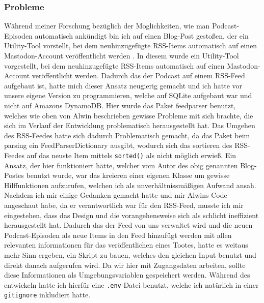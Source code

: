 \documentclass{article}
\begin{document}
\subsubsection{Probleme}
\begin{sloppypar}
  Während meiner Forschung bezüglich der Moglichkeiten, wie man Podcast-Episoden automatisch ankündigt bin ich auf einen Blog-Post gestoßen, der ein Utility-Tool vorstellt, bei dem neuhinzugefügte RSS-Items automatisch auf einen Mastodon-Account veröffentlicht werden \cite{tootrss}. In diesem wurde ein Utility-Tool vorgestellt, bei dem neuhinzugefügte RSS-Items automatisch auf einen Mastodon-Account veröffentlicht werden. Dadurch das der Podcast auf einem RSS-Feed aufgebaut ist, hatte mich dieser Ansatz neugierig gemacht und ich hatte vor unsere eigene Version zu programmieren, welche auf SQLite aufgebaut war und nicht auf Amazons DynamoDB. Hier wurde das Paket feedparser benutzt, welches wie oben von Alwin beschrieben gewisse Probleme mit sich brachte, die sich im Verlauf der Entwicklung problematisch herausgestellt hat. Das Umgehen des RSS-Feedes hatte sich dadurch Problematisch gemacht, da das Paket beim parsing ein FeedParserDictionary ausgibt, wodurch sich das sortieren des RSS-Feedes auf das neuste Item mittels \texttt{sorted()} als nicht möglich erwieß. Ein Ansatz, der hier funktioniert hätte, welcher vom Autor des obig genannten Blog-Postes benutzt wurde, war das kreieren einer eigenen Klasse um gewisse Hilffunktionen aufzurufen, welchen ich als unverhältnissmäßigen Aufwand ansah. Nachdem ich mir einige Gedanken gemacht hatte und mir Alwins Code angeschaut habe, da er verantwortlich war für den RSS-Feed, musste ich mir eingestehen, dass das Design und die vorangehensweise sich als schlicht ineffizient herausgestellt hat. Dadurch das der Feed von uns verwaltet wird und die neuen Podcast-Episoden als neue Items in den Feed hinzufügt werden mit allen relevanten informationen für das veröffentlichen eines Tootes, hatte es weitaus mehr Sinn ergeben, ein Skript zu bauen, welches den gleichen Input benutzt und direkt danach aufgerufen wird.
  Da wir hier mit Zugangsdaten arbeiten, sollte diese Informationen als Umgebungsvariablen gespeichert werden. Während des entwickeln hatte ich hierfür eine \texttt{.env}-Datei benutzt, welche ich natürlich in einer \texttt{gitignore} inkludiert hatte.
\end{sloppypar}
\end{document}

